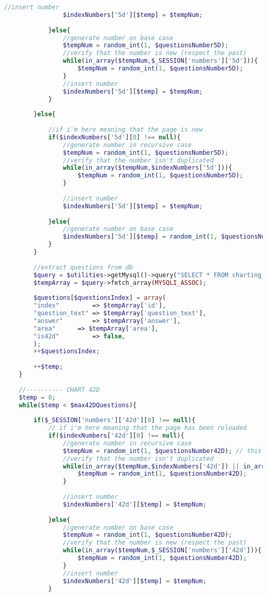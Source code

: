 \begin{lstlisting}[language=php]
				//insert number
				$indexNumbers['5d'][$temp] = $tempNum; 
				
			}else{
				//generate number on base case
				$tempNum = random_int(1, $questionsNumber5D);
				//verify that the number is new (respect the past)
				while(in_array($tempNum,$_SESSION['numbers']['5d'])){
					$tempNum = random_int(1, $questionsNumber5D);
				}
				//insert number
				$indexNumbers['5d'][$temp] = $tempNum; 
			}
			
		}else{
			
			//if i'm here meaning that the page is new
			if($indexNumbers['5d'][0] !== null){
				//generate number in recursive case
				$tempNum = random_int(1, $questionsNumber5D);
				//verify that the number isn't duplicated
				while(in_array($tempNum,$indexNumbers['5d'])){
					$tempNum = random_int(1, $questionsNumber5D);
				}
				
				//insert number
				$indexNumbers['5d'][$temp] = $tempNum;
				
			}else{
				//generate number on base case
				$indexNumbers['5d'][$temp] = random_int(1, $questionsNumber5D);
			}
		}
		
		//extract questions from db
		$query = $utilities->getMysql()->query("SELECT * FROM charting_test_5d WHERE (id = '{$indexNumbers['5d'][$temp]}')");
		$tempArray = $query->fetch_array(MYSQLI_ASSOC);  
		
		$questions[$questionsIndex] = array(
		"index"         => $tempArray['id'],
		"question_text" => $tempArray['question_text'],
		"answer"        => $tempArray['answer'],
		"area"		=> $tempArray['area'],
		"is42d"         => false,
		);
		++$questionsIndex;
		
		++$temp;
	}
	
	//---------- CHART 42D
	$temp = 0;
	while($temp < $max42DQuestions){
		
		if($_SESSION['numbers']['42d'][0] !== null){
			// if i'm here meaning that the page has been reloaded     
			if($indexNumbers['42d'][0] !== null){
				//generate number in recursive case
				$tempNum = random_int(1, $questionsNumber42D); // this 1 is because i know that the questions starts form 1 into db
				//verify that the number isn't duplicated
				while(in_array($tempNum,$indexNumbers['42d']) || in_array($tempNum,$_SESSION['numbers']['42d'])){
					$tempNum = random_int(1, $questionsNumber42D);
				}
				
				//insert number
				$indexNumbers['42d'][$temp] = $tempNum; 
				
			}else{
				//generate number on base case
				$tempNum = random_int(1, $questionsNumber42D);
				//verify that the number is new (respect the past)
				while(in_array($tempNum,$_SESSION['numbers']['42d'])){
					$tempNum = random_int(1, $questionsNumber42D);
				}
				//insert number
				$indexNumbers['42d'][$temp] = $tempNum; 
			}
			

\end{lstlisting}

